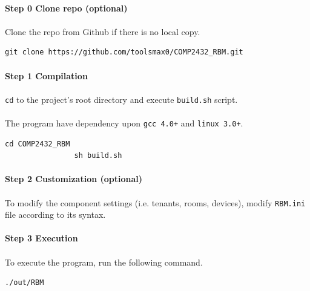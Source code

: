 \documentclass{article}
\begin{document}
            \paragraph{Step 0 Clone repo (optional)}
            \paragraph{}
                Clone the repo from Github if there is no local copy.
            \begin{Verbatim}[gobble=8]
                git clone https://github.com/toolsmax0/COMP2432_RBM.git
            \end{Verbatim}
            \paragraph{Step 1 Compilation}
            \paragraph{}
                \texttt{cd} to the project's root directory and execute \texttt{build.sh} script.
            \paragraph{}
                The program have dependency upon \texttt{gcc 4.0+} and \texttt{linux 3.0+}.
            \begin{Verbatim}[gobble=8]
                cd COMP2432_RBM
                sh build.sh
            \end{Verbatim}
            \paragraph{Step 2 Customization (optional)}
            \paragraph{}
                To modify the component settings (i.e. tenants, rooms, devices),
                modify \texttt{RBM.ini} file according to its syntax.
            \paragraph{Step 3 Execution}
            \paragraph{}
                To execute the program, run the following command.
            \begin{Verbatim}[gobble=8]
                ./out/RBM
            \end{Verbatim}
\end{document}
